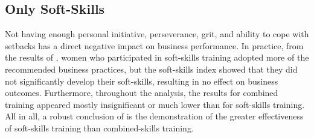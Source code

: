 \subsection{Only Soft-Skills}

Not having enough personal initiative, perseverance, grit, and ability to cope with setbacks has a direct negative impact on business performance. In practice, from the results of \cite{Ubfal2022}, women who participated in soft-skills training adopted more of the recommended business practices, but the soft-skills index showed that they did not significantly develop their soft-skills, resulting in no effect on business outcomes. Furthermore, throughout the analysis, the results for combined training appeared mostly insignificant or much lower than for soft-skills training. All in all, a robust conclusion of \cite{Ubfal2022} is the demonstration of the greater effectiveness of soft-skills training than combined-skills training.